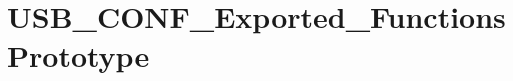 \hypertarget{group___u_s_b___c_o_n_f___exported___functions_prototype}{\section{U\-S\-B\-\_\-\-C\-O\-N\-F\-\_\-\-Exported\-\_\-\-Functions\-Prototype}
\label{group___u_s_b___c_o_n_f___exported___functions_prototype}
}
